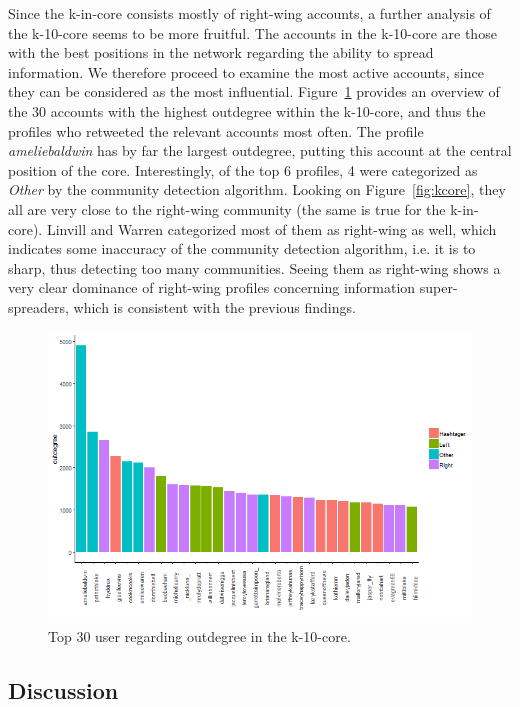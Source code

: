 \documentclass[12pt, titlepage=true, toc=bib]{scrartcl}
\begin{document}
Since the k-in-core consists mostly of right-wing accounts, a further analysis of the k-10-core seems to be more fruitful. The accounts in the k-10-core are those with the best positions in the network regarding the ability to spread information. We therefore proceed to examine the most active accounts, since they can be considered as the most influential. Figure~\ref{fig:k10in} provides an overview of the 30 accounts with the highest outdegree within the k-10-core, and thus the profiles who retweeted the relevant accounts most often. The profile \textit{ameliebaldwin} has by far the largest outdegree, putting this account at the central position of the core. Interestingly, of the top 6 profiles, 4 were categorized as \textit{Other} by the community detection algorithm. Looking on Figure~\ref{fig:kcore}, they all are very close to the right-wing community (the same is true for the k-in-core). Linvill and Warren categorized most of them as right-wing as well, which indicates some inaccuracy of the community detection algorithm, i.e. it is to sharp, thus detecting too many communities. Seeing them as right-wing shows a very clear dominance of right-wing profiles concerning information super-spreaders, which is consistent with the previous findings.

\begin{figure}[!ht]
\centering
\includegraphics[width=0.95\linewidth]{k10_figure}
\caption[Outdegree in the k-core]{Top 30 user regarding outdegree in the k-10-core.}
\label{fig:k10in}
\end{figure}


\subsection{Discussion}
\end{document}
